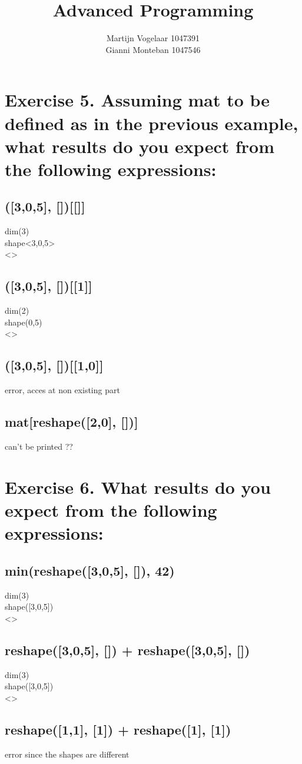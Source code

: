 \documentclass[a4paper]{article}
\title{Advanced Programming }
\author{Martijn Vogelaar 1047391 \\ Gianni Monteban 1047546}
\begin{document}
\maketitle

\section*{Exercise 5. Assuming mat to be defined as in the previous example, what results do you expect from the following expressions:}
\subsection*{([3,0,5], [])[[]]}
dim(3)\\
shape<3,0,5>\\
<>
\subsection*{([3,0,5], [])[[1]]}
dim(2)\\
shape(0,5)\\
<>
\subsection*{([3,0,5], [])[[1,0]]}
error, acces at non existing part
\subsection*{mat[reshape([2,0], [])]}
can't be printed ??
\section*{Exercise 6. What results do you expect from the following expressions:}
\subsection*{min(reshape([3,0,5], []), 42)}
dim(3)\\
shape([3,0,5])\\
<>
\subsection*{reshape([3,0,5], []) + reshape([3,0,5], [])}
dim(3)\\
shape([3,0,5])\\
<>
\subsection*{reshape([1,1], [1]) + reshape([1], [1])}
error since the shapes are different
\end{document}
